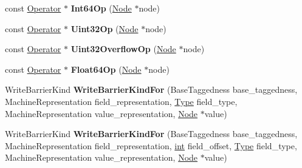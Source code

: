 \begin{DoxyCompactItemize}
const \mbox{\hyperlink{classv8_1_1internal_1_1compiler_1_1Operator}{Operator}} $\ast$ {\bfseries Int64\+Op} (\mbox{\hyperlink{classv8_1_1internal_1_1compiler_1_1Node}{Node}} $\ast$node)
\item 
\mbox{\label{classv8_1_1internal_1_1compiler_1_1RepresentationSelector_a06ca706e0243a1ed3f6355674dc15347}} 
const \mbox{\hyperlink{classv8_1_1internal_1_1compiler_1_1Operator}{Operator}} $\ast$ {\bfseries Uint32\+Op} (\mbox{\hyperlink{classv8_1_1internal_1_1compiler_1_1Node}{Node}} $\ast$node)
\item 
\mbox{\label{classv8_1_1internal_1_1compiler_1_1RepresentationSelector_a1e0f16316a48108f04b4ca69f196867a}} 
const \mbox{\hyperlink{classv8_1_1internal_1_1compiler_1_1Operator}{Operator}} $\ast$ {\bfseries Uint32\+Overflow\+Op} (\mbox{\hyperlink{classv8_1_1internal_1_1compiler_1_1Node}{Node}} $\ast$node)
\item 
\mbox{\label{classv8_1_1internal_1_1compiler_1_1RepresentationSelector_ae567cdfcdf93bb5487b1f7711da640f7}} 
const \mbox{\hyperlink{classv8_1_1internal_1_1compiler_1_1Operator}{Operator}} $\ast$ {\bfseries Float64\+Op} (\mbox{\hyperlink{classv8_1_1internal_1_1compiler_1_1Node}{Node}} $\ast$node)
\item 
\mbox{\label{classv8_1_1internal_1_1compiler_1_1RepresentationSelector_a821b787338eae0e5a5ef835d9f3bf259}} 
Write\+Barrier\+Kind {\bfseries Write\+Barrier\+Kind\+For} (Base\+Taggedness base\+\_\+taggedness, Machine\+Representation field\+\_\+representation, \mbox{\hyperlink{classv8_1_1internal_1_1compiler_1_1Type}{Type}} field\+\_\+type, Machine\+Representation value\+\_\+representation, \mbox{\hyperlink{classv8_1_1internal_1_1compiler_1_1Node}{Node}} $\ast$value)
\item 
\mbox{\label{classv8_1_1internal_1_1compiler_1_1RepresentationSelector_a79456adc1fd700c5588b6e64059108da}} 
Write\+Barrier\+Kind {\bfseries Write\+Barrier\+Kind\+For} (Base\+Taggedness base\+\_\+taggedness, Machine\+Representation field\+\_\+representation, \mbox{\hyperlink{classint}{int}} field\+\_\+offset, \mbox{\hyperlink{classv8_1_1internal_1_1compiler_1_1Type}{Type}} field\+\_\+type, Machine\+Representation value\+\_\+representation, \mbox{\hyperlink{classv8_1_1internal_1_1compiler_1_1Node}{Node}} $\ast$value)

\end{DoxyCompactItemize}
